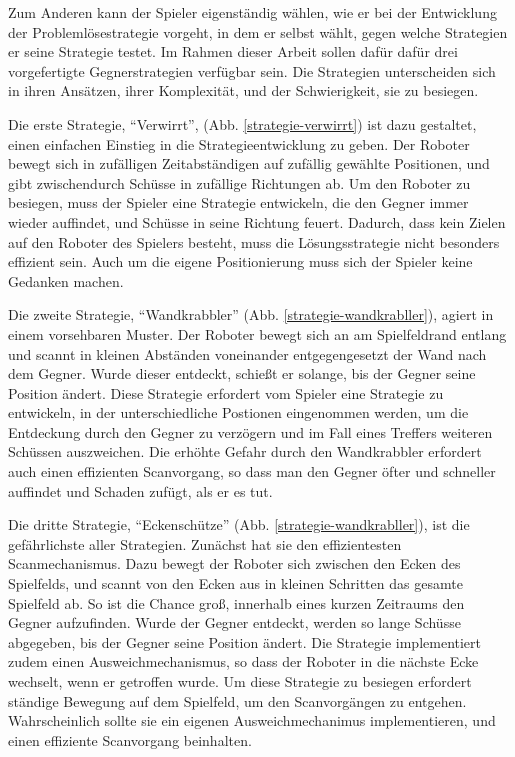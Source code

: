 Zum Anderen kann der Spieler eigenständig wählen, wie er bei der Entwicklung der
Problemlösestrategie vorgeht, in dem er selbst wählt, gegen welche Strategien er seine Strategie
testet. Im Rahmen dieser Arbeit sollen dafür dafür drei vorgefertigte Gegnerstrategien verfügbar
sein. Die Strategien unterscheiden sich in ihren Ansätzen, ihrer Komplexität, und der Schwierigkeit,
sie zu besiegen.

Die erste Strategie, \enquote{Verwirrt}, (Abb. \ref{strategie-verwirrt}) ist dazu gestaltet, einen
einfachen Einstieg in die Strategieentwicklung zu geben. Der Roboter bewegt sich in zufälligen
Zeitabständigen auf zufällig gewählte Positionen, und gibt zwischendurch Schüsse in zufällige
Richtungen ab. Um den Roboter zu besiegen, muss der Spieler eine Strategie entwickeln, die den
Gegner immer wieder auffindet, und Schüsse in seine Richtung feuert. Dadurch, dass kein
Zielen auf den Roboter des Spielers besteht, muss die Lösungsstrategie nicht besonders effizient
sein. Auch um die eigene Positionierung muss sich der Spieler keine Gedanken machen.

Die zweite Strategie, \enquote{Wandkrabbler} (Abb. \ref{strategie-wandkrabller}), agiert in einem
vorsehbaren Muster. Der Roboter bewegt sich an am Spielfeldrand entlang und scannt in kleinen
Abständen voneinander entgegengesetzt der Wand nach dem Gegner. Wurde dieser entdeckt, schießt er
solange, bis der Gegner seine Position ändert. Diese Strategie erfordert vom Spieler eine Strategie
zu entwickeln, in der unterschiedliche Postionen eingenommen werden, um die Entdeckung durch den
Gegner zu verzögern und im Fall eines Treffers weiteren Schüssen auszweichen. Die erhöhte Gefahr
durch den Wandkrabbler erfordert auch einen effizienten Scanvorgang, so dass man den Gegner öfter
und schneller auffindet und Schaden zufügt, als er es tut.

Die dritte Strategie, \enquote{Eckenschütze} (Abb. \ref{strategie-wandkrabller}), ist die
gefährlichste aller Strategien. Zunächst hat sie den effizientesten Scanmechanismus. Dazu bewegt der
Roboter sich zwischen den Ecken des Spielfelds, und scannt von den Ecken aus in kleinen Schritten
das gesamte Spielfeld ab. So ist die Chance groß, innerhalb eines kurzen Zeitraums den Gegner
aufzufinden. Wurde der Gegner entdeckt, werden so lange Schüsse abgegeben, bis der Gegner seine
Position ändert. Die Strategie implementiert zudem einen Ausweichmechanismus, so dass der Roboter in die
nächste Ecke wechselt, wenn er getroffen wurde. Um diese Strategie zu besiegen erfordert ständige
Bewegung auf dem Spielfeld, um den Scanvorgängen zu entgehen. Wahrscheinlich sollte sie ein eigenen
Ausweichmechanimus implementieren, und einen effiziente Scanvorgang beinhalten.

